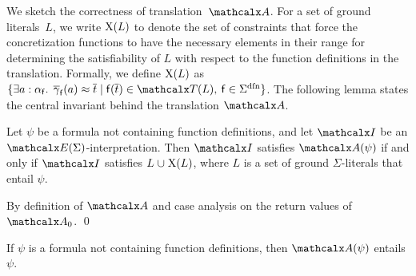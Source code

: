 \begin{longv}
We sketch the correctness of translation~$\conv$.
For a set of ground literals~$L$, 
we write $\mathrm{X}( L )$ to denote the set of constraints that
force the concretization functions to have the necessary elements in their
range for determining the satisfiability of $L$ with respect to the function
definitions in the translation.
Formally, we define
$\mathrm{X}( L )$
as
$\{ \exists a : {\fargtype{\con{f}}}.\;\, \vecfarg{\con{f}}( a ) \teq \vec t
\mid \con{f}( \vec t ) \in \terms( L ),\: \con{f} \in \sfundefs{\Sigma}
\}$.
The following lemma states the central invariant behind the translation $\conv$.

\begin{lemma}\label{lem:conv}
Let $\psi$ be a formula not containing function definitions,
and let $\I$ be an $\extendsig{\Sigma}$-interpretation.
Then $\I$ satisfies $\conv( \psi )$ if and only if
$\I$ satisfies $L \cup \absconstraints( L )$, where $L$ is a set of ground $\Sigma$-literals that entail $\psi$.
\end{lemma}
\begin{proofsketch}
By definition of $\conv$ and case analysis on the return values of $\conv_0$.
\qed
\end{proofsketch}

\begin{corollary}\label{cor:conv}
If $\psi$ is a formula not containing function definitions, then $\conv( \psi )$ entails $\psi$.
\end{corollary}
\end{longv}

